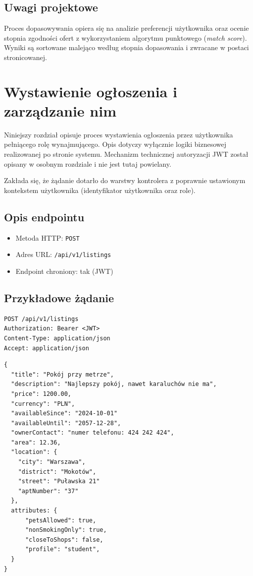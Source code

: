 \documentclass[11pt, a4paper]{article}
\begin{document}
\subsection{Uwagi projektowe}

Proces dopasowywania opiera się na analizie preferencji użytkownika oraz
ocenie stopnia zgodności ofert z wykorzystaniem algorytmu punktowego
(\textit{match score}). Wyniki są sortowane malejąco według stopnia dopasowania
i zwracane w postaci stronicowanej.

\section{Wystawienie ogłoszenia i zarządzanie nim}

Niniejszy rozdział opisuje proces wystawienia ogłoszenia przez użytkownika
pełniącego rolę wynajmującego. Opis dotyczy wyłącznie logiki biznesowej
realizowanej po stronie systemu. Mechanizm technicznej autoryzacji JWT został
opisany w osobnym rozdziale i nie jest tutaj powielany.

Zakłada się, że żądanie dotarło do warstwy kontrolera z poprawnie ustawionym
kontekstem użytkownika (identyfikator użytkownika oraz role).

\subsection{Opis endpointu}

\begin{itemize}
    \item Metoda HTTP: \texttt{POST}
    \item Adres URL: \texttt{/api/v1/listings}
    \item Endpoint chroniony: tak (JWT)
\end{itemize}

\subsection{Przykładowe żądanie}

\begin{lstlisting}[style=http,caption={Żądanie HTTP — wystawienie szczegółów ogłoszenia}]
POST /api/v1/listings
Authorization: Bearer <JWT>
Content-Type: application/json
Accept: application/json
\end{lstlisting}

\begin{lstlisting}[style=json,caption={Ciało żądania — wystawienie ogłoszenia}]
{
  "title": "Pokój przy metrze",
  "description": "Najlepszy pokój, nawet karaluchów nie ma",
  "price": 1200.00,
  "currency": "PLN",
  "availableSince": "2024-10-01"
  "availableUntil": "2057-12-28",
  "ownerContact": "numer telefonu: 424 242 424",
  "area": 12.36,
  "location": {
    "city": "Warszawa",
    "district": "Mokotów",
    "street": "Puławska 21"
    "aptNumber": "37"
  },
  attributes: {
      "petsAllowed": true,
      "nonSmokingOnly": true,
      "closeToShops": false,
      "profile": "student",
  }
}
\end{lstlisting}
\end{document}
